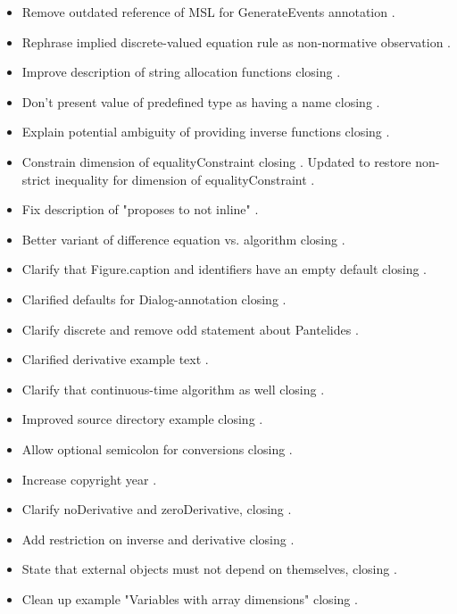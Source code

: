 \begin{itemize}
\item Remove outdated reference of MSL for GenerateEvents annotation .
\item Rephrase implied discrete-valued equation rule as non-normative observation .
\item Improve description of string allocation functions  closing .
\item Don't present value of predefined type as having a name  closing .
\item Explain potential ambiguity of providing inverse functions  closing .
\item Constrain dimension of equalityConstraint  closing .
Updated to restore non-strict inequality for dimension of equalityConstraint .
\item Fix description of "proposes to not inline" .
\item Better variant of difference equation vs. algorithm  closing .
\item Clarify that Figure.caption and identifiers have an empty default  closing .
\item Clarified defaults for Dialog-annotation  closing .
\item Clarify discrete and remove odd statement about Pantelides .
\item Clarified derivative example text .
\item Clarify that continuous-time algorithm as well  closing .
\item Improved source directory example  closing .
\item Allow optional semicolon for conversions  closing .
\item Increase copyright year .
\item Clarify noDerivative and zeroDerivative,  closing .
\item Add restriction on inverse and derivative  closing .
\item State that external objects must not depend on themselves,  closing .
\item Clean up example "Variables with array dimensions"  closing .

\end{itemize}

